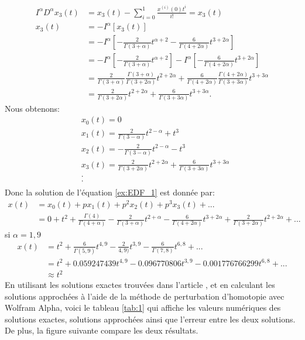 \begin{align*}
    I^{\alpha}D^{\alpha}x_3(t) &= x_3(t) - \sum_{i=0}^{1} \frac{x^{(i)}(0)t^i}{i!} = x_3(t)\\
    x_3(t) &= -I^{\alpha} [x_3(t)]\\
    &= -I^{\alpha} \left[ -\frac{2}{\Gamma(3+\alpha)} t^{\alpha+2} - \frac{6}{\Gamma(4+2\alpha)}t^{3+2\alpha}\right]\\
    &= -I^{\alpha} \left[ -\frac{2}{\Gamma(3+\alpha)} t^{\alpha+2} \right] - I^{\alpha} \left[ - \frac{6}{\Gamma(4+2\alpha)}t^{3+2\alpha} \right]\\
    &= \frac{2}{\Gamma(3+\alpha)}\frac{\Gamma(3+\alpha)}{\Gamma(3+2\alpha)} t^{2+2\alpha} + \frac{6}{\Gamma(4+2\alpha)} \frac{\Gamma(4+2\alpha)}{\Gamma(3+3\alpha)}t^{3+3\alpha}\\
    &= \frac{2}{\Gamma(3+2\alpha)}t^{2+2\alpha} + \frac{6}{\Gamma(3+3\alpha)} t^{3+3\alpha}.
\end{align*}
Nous obtenons:
\begin{align*}
    &x _0(t)=0\\
    & x_1(t) = \frac{2}{\Gamma(3-\alpha)}t^{2-\alpha} + t^3\\
    & x_2(t) = -\frac{2}{\Gamma(3-\alpha)} t^{2-\alpha} -t^3\\
    & x_3(t) = \frac{2}{\Gamma(3+2\alpha)}t^{2+2\alpha} + \frac{6}{\Gamma(3+3\alpha)} t^{3+3\alpha} \\
    & .\\
    & .\\
\end{align*}
Donc la solution de l'équation \ref{ex:EDF_1} est donnée par:
\begin{align*}
        x(t) &= x_0(t) + px_1(t) + p^2x_2(t) + p^3x_3(t)+...\\
        & = 0 + t^2 + \frac{\Gamma(4)}{\Gamma(4+\alpha)} -\frac{2}{\Gamma(3+\alpha)} t^{2+\alpha} -\frac{6}{\Gamma(4+2\alpha)} t^{3+2\alpha} + \frac{2}{\Gamma(3+2\alpha)}t^{2+2\alpha} +...
\end{align*}
si $\alpha = 1,9$
\begin{align*}
    x(t) &= t^2 + \frac{6}{\Gamma(5,9)}t^{4,9} -\frac{2}{4,9)}t^{3,9} - \frac{6}{\Gamma(7,8)}t^{6,8} + ...\\
    &= t^2 + 0.059247439t^{4,9} - 0.096770806t^{3,9} - 0.001776766299 t^{6,8} + ...\\
    & \approx t^2
\end{align*}
En utilisant les solutions exactes trouvées dans l'article \cite{Numerical_sol}, et en calculant les solutions approchées à l'aide de la méthode de perturbation d'homotopie avec Wolfram Alpha, voici le tableau \ref{tab:1} qui affiche les valeurs numériques des solutions exactes, solutions approchées ainsi que l'erreur entre les deux solutions. De plus, la figure suivante compare les deux résultats. 
